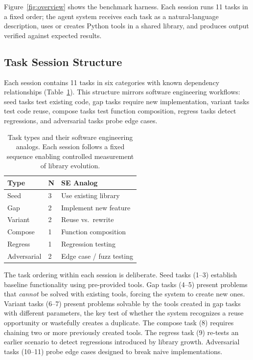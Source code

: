 \documentclass[sigplan,review,anonymous]{acmart}
\begin{document}
Figure~\ref{fig:overview} shows the benchmark harness. Each session runs 11 tasks in a fixed order; the agent system receives each task as a natural-language description, uses or creates Python tools in a shared library, and produces output verified against expected results.

\subsection{Task Session Structure}

Each session contains 11 tasks in six categories with known dependency relationships (Table~\ref{tab:task_types}). This structure mirrors software engineering workflows: seed tasks test existing code, gap tasks require new implementation, variant tasks test code reuse, compose tasks test function composition, regress tasks detect regressions, and adversarial tasks probe edge cases.

\begin{table}[t]
\centering
\footnotesize
\begin{tabular}{llp{3.2cm}}
\toprule
\textbf{Type} & \textbf{N} & \textbf{SE Analog} \\
\midrule
Seed & 3 & Use existing library \\
Gap & 2 & Implement new feature \\
Variant & 2 & Reuse vs.\ rewrite \\
Compose & 1 & Function composition \\
Regress & 1 & Regression testing \\
Adversarial & 2 & Edge case / fuzz testing \\
\bottomrule
\end{tabular}
\caption{Task types and their software engineering analogs. Each session follows a fixed sequence enabling controlled measurement of library evolution.}
\label{tab:task_types}
\end{table}

The task ordering within each session is deliberate. Seed tasks (1--3) establish baseline functionality using pre-provided tools. Gap tasks (4--5) present problems that \emph{cannot} be solved with existing tools, forcing the system to create new ones. Variant tasks (6--7) present problems solvable by the tools created in gap tasks with different parameters, the key test of whether the system recognizes a reuse opportunity or wastefully creates a duplicate. The compose task (8) requires chaining two or more previously created tools. The regress task (9) re-tests an earlier scenario to detect regressions introduced by library growth. Adversarial tasks (10--11) probe edge cases designed to break naive implementations.
\end{document}
